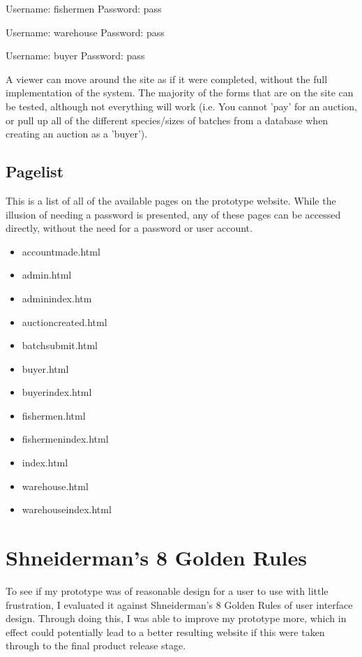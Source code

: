\documentclass{article}
\begin{document}
Username: fishermen
Password: pass

Username: warehouse
Password: pass

Username: buyer
Password: pass

A viewer can move around the site as if it were completed, without the full implementation of the system. The majority of the forms that are on the site can be tested, although not everything will work (i.e. You cannot 'pay' for an auction, or pull up all of the different species/sizes of batches from a database when creating an auction as a 'buyer').

\subsection{Pagelist}
This is a list of all of the available pages on the prototype website. While the illusion of needing a password is presented, any of these pages can be accessed directly, without the need for a password or user account.
\begin{itemize}
	\item{accountmade.html}
\item{admin.html}
\item{adminindex.htm}
\item{auctioncreated.html}
\item{batchsubmit.html}
\item{buyer.html}
\item{buyerindex.html}
\item{fishermen.html}
\item{fishermenindex.html}
\item{index.html}
\item{warehouse.html}
\item{warehouseindex.html}
\end{itemize}


\section{Shneiderman’s 8 Golden Rules}
To see if my prototype was of reasonable design for a user to use with little frustration, I evaluated it against Shneiderman's 8 Golden Rules of user interface design\cite{8r}. Through doing this, I was able to improve my prototype more, which in effect could potentially lead to a better resulting website if this were taken through to the final product release stage.
\end{document}
